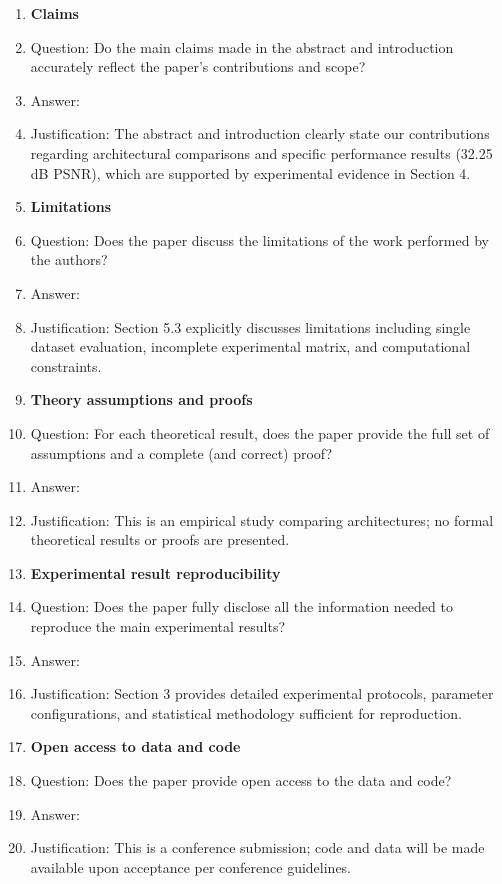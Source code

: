 \documentclass{article}
\begin{document}
\begin{enumerate}

\item {\bf Claims}
    \item[] Question: Do the main claims made in the abstract and introduction accurately reflect the paper's contributions and scope?
    \item[] Answer: \answerYes{}
    \item[] Justification: The abstract and introduction clearly state our contributions regarding architectural comparisons and specific performance results (32.25 dB PSNR), which are supported by experimental evidence in Section 4.

\item {\bf Limitations}
    \item[] Question: Does the paper discuss the limitations of the work performed by the authors?
    \item[] Answer: \answerYes{}
    \item[] Justification: Section 5.3 explicitly discusses limitations including single dataset evaluation, incomplete experimental matrix, and computational constraints.

\item {\bf Theory assumptions and proofs}
    \item[] Question: For each theoretical result, does the paper provide the full set of assumptions and a complete (and correct) proof?
    \item[] Answer: \answerNA{}
    \item[] Justification: This is an empirical study comparing architectures; no formal theoretical results or proofs are presented.

\item {\bf Experimental result reproducibility}
    \item[] Question: Does the paper fully disclose all the information needed to reproduce the main experimental results?
    \item[] Answer: \answerYes{}
    \item[] Justification: Section 3 provides detailed experimental protocols, parameter configurations, and statistical methodology sufficient for reproduction.

\item {\bf Open access to data and code}
    \item[] Question: Does the paper provide open access to the data and code?
    \item[] Answer: \answerNo{}
    \item[] Justification: This is a conference submission; code and data will be made available upon acceptance per conference guidelines.


\end{enumerate}
\end{document}
